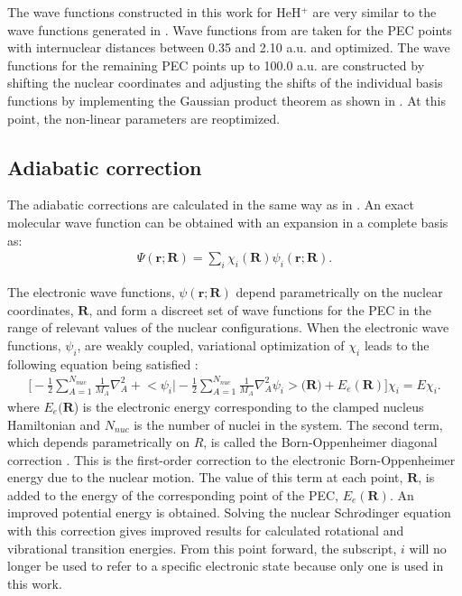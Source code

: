 \documentclass[aps,onecolumn]{revtex4}
\begin{document}
The wave functions constructed in this work for HeH$^+$ are very similar to the wave functions
generated in 
\cite{HeH+_Wei2012}. Wave functions from \cite{HeH+_Wei2012} are taken for the PEC points with
internuclear distances between 0.35 and 2.10 a.u. and optimized. The wave functions for the remaining PEC
points up to 100.0 a.u. are constructed by shifting the nuclear coordinates and adjusting
the shifts of the individual basis functions by implementing the Gaussian product theorem as shown
in \cite{GPT}. At this point, the non-linear parameters are reoptimized.

\subsection{Adiabatic correction}
The adiabatic corrections are calculated in the same way as in \cite{HeH+_Wei2012}.
An exact molecular wave function can be obtained with an expansion 
in a complete basis as:
\begin{eqnarray}
\Psi(\mathbf{r};\mathbf{R}) = \sum_{i}\chi_i(\mathbf{R})\psi_i(\mathbf{r};\mathbf{R}).
\end{eqnarray}

The electronic wave functions, $\psi(\mathbf{r};\mathbf{R})$ depend parametrically on the
nuclear coordinates, $\mathbf{R}$, and form a discreet set of 
wave functions for the PEC in the range
of relevant values of the nuclear configurations. 
When the electronic wave functions, $\psi_i$, are weakly coupled,
variational optimization of $\chi_i$ leads to the following equation being satisfied \cite{Adiabatic1}:
\begin{eqnarray}
\bigg[-\frac{1}{2}\sum_{A=1}^{N_{nuc}}\frac{1}{M_A}\nabla_A^2 + \bigg<\psi_i\bigg|-\frac{1}{2}
\sum_{A=1}^{N_{nuc}}\frac{1}{M_A}
\nabla_A^2\psi_i\bigg>\bigg(\mathbf{R}\bigg) + E_e(\mathbf{R})\bigg]\chi_i = E\chi_i.
\end{eqnarray}
where $E_e(\mathbf{R}$) is the electronic energy 
corresponding to the clamped nucleus Hamiltonian and $N_{nuc}$
is the number of nuclei in the system. The second term,
which depends parametrically on $R$, is called the Born-Oppenheimer diagonal correction \cite{Adiabatic1,
Adiabatic2}. This is the first-order correction to the electronic Born-Oppenheimer energy due to the nuclear motion.
The value of this term at each point, $\mathbf{R}$, is added to the energy 
of the corresponding point of the PEC, $E_e(\mathbf{R})$.
An improved potential energy is obtained. Solving the nuclear Schr$\ddot{o}$dinger equation with
this correction gives improved results for calculated rotational and vibrational transition energies.
From this point forward, the subscript, $i$ will no longer be used to refer to a specific electronic
state because only one is used in this work.
\end{document}
